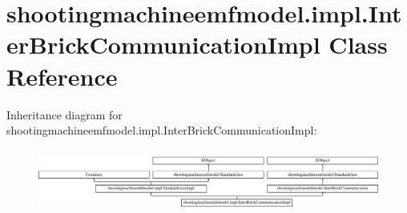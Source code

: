 \hypertarget{classshootingmachineemfmodel_1_1impl_1_1_inter_brick_communication_impl}{\section{shootingmachineemfmodel.\-impl.\-Inter\-Brick\-Communication\-Impl Class Reference}
\label{classshootingmachineemfmodel_1_1impl_1_1_inter_brick_communication_impl}
}
Inheritance diagram for shootingmachineemfmodel.\-impl.\-Inter\-Brick\-Communication\-Impl\-:\begin{figure}[H]
\begin{center}
\leavevmode
\includegraphics[height=2.085661cm]{classshootingmachineemfmodel_1_1impl_1_1_inter_brick_communication_impl}
\end{center}
\end{figure}
